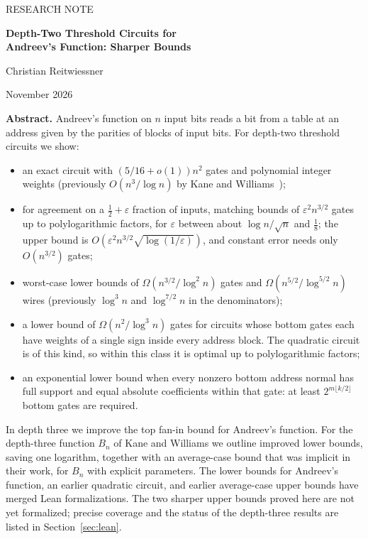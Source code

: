 \documentclass[11pt,letterpaper]{article}
\theoremstyle{remark}
\begin{document}
\thispagestyle{empty}
{\color{accent}\small RESEARCH NOTE\par}
\vspace{0.4em}
{\raggedright\color{ink}\LARGE\bfseries Depth-Two Threshold Circuits for\\[0.15em]
Andreev's Function: Sharper Bounds\par}
\vspace{0.5em}
{\large Christian Reitwiessner\par}
{\small November 2026\par}
\vspace{0.8em}

\begin{keybox}
\textbf{Abstract.} Andreev's function on $n$ input bits reads a bit from a
table at an address given by the parities of blocks of input bits. For
depth-two threshold circuits we show:
\begin{itemize}
\item an exact circuit with $(5/16+o(1))n^2$ gates and polynomial integer
      weights (previously $O(n^3/\log n)$ by Kane and Williams~\cite{KW});
\item for agreement on a $\tfrac12+\varepsilon$ fraction of inputs, matching
      bounds of $\varepsilon^2n^{3/2}$ gates up to polylogarithmic factors,
      for $\varepsilon$ between about $\log n/\sqrt n$ and $\tfrac18$;
      the upper bound is $O(\varepsilon^2n^{3/2}\sqrt{\log(1/\varepsilon)})$,
      and constant error needs only $O(n^{3/2})$ gates;
\item worst-case lower bounds of $\Omega(n^{3/2}/\log^2 n)$ gates and
      $\Omega(n^{5/2}/\log^{5/2}n)$ wires (previously $\log^3 n$ and
      $\log^{7/2}n$ in the denominators);
\item a lower bound of $\Omega(n^2/\log^3n)$ gates for circuits whose bottom
      gates each have weights of a single sign inside every address block.
      The quadratic circuit is of this kind, so within this class it is
      optimal up to polylogarithmic factors;
\item an exponential lower bound when every nonzero bottom address normal
      has full support and equal absolute coefficients within that gate:
      at least $2^{m\lfloor k/2\rfloor}$ bottom gates are required.
\end{itemize}
In depth three we improve the top fan-in bound for Andreev's function. For
the depth-three function $B_n$ of Kane and Williams we outline improved
lower bounds, saving one logarithm, together with an average-case bound that
was implicit in their work, for $B_n$ with explicit parameters. The lower
bounds for Andreev's function, an earlier quadratic circuit, and earlier
average-case upper bounds have merged Lean formalizations. The two sharper
upper bounds proved here are not yet formalized; precise coverage and the
status of the depth-three results are listed in Section~\ref{sec:lean}.
\end{keybox}
\end{document}
